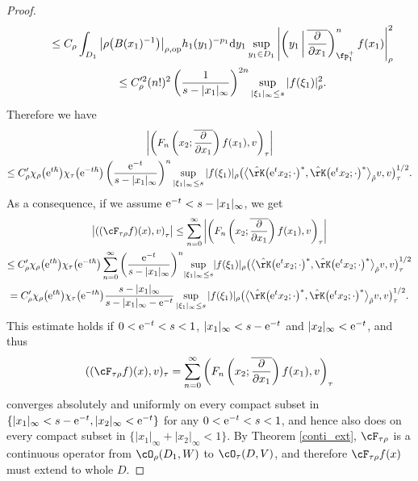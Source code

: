 \begin{proof}
\begin{gather}
\qquad{} \le C_\rho\int_{D_1} \big|\rho\big(B(x_1)^{-1}\big)\big|_{\rho,\mathrm{op}}h_1(y_1)^{-p_1}{\rm d}y_1
\sup_{y_1\in D_1}\left|\left(y_1\,\middle|\,\overline{\frac{\partial}{\partial x_1}}\right)_{\fp^+_1}^nf(x_1)\right|_\rho^2 \notag \\
\qquad{} \le C_\rho^{\prime 2}(n!)^2\left(\frac{1}{s-|x_1|_\infty}\right)^{2n}\sup_{|\xi_1|_\infty\le s}|f(\xi_1)|_\rho^2. \label{higherdiff}
\end{gather}
Therefore we have
\begin{gather*}
 \left|\left(F_n\left(x_2;\overline{\frac{\partial}{\partial x_1}}\right)f(x_1),v\right)_\tau\right| \\
 \le C_\rho'\chi_\rho\big({\rm e}^{t\hbar}\big)\chi_\tau\big({\rm e}^{-t\hbar}\big)
\left(\frac{{\rm e}^{-t}}{s-|x_1|_\infty}\right)^n\sup_{|\xi_1|_\infty\le s}|f(\xi_1)|_\rho
\big(\big\langle\hat{\rK}\big({\rm e}^tx_2;\cdot\big)^*,
\hat{\rK}\big({\rm e}^tx_2;\cdot\big)^*\big\rangle_{\hat{\rho}}v,v\big)_\tau^{1/2}.
\end{gather*}
As a consequence, if we assume ${\rm e}^{-t}<s-|x_1|_\infty$, we get
\begin{gather*}
 \left|\left((\cF_{\tau\rho}f)(x),v\right)_\tau\right|\le\sum_{n=0}^\infty
\left|\left(F_n\left(x_2;\overline{\frac{\partial}{\partial x_1}}\right)f(x_1),v\right)_\tau\right| \\
 \le C_\rho'\chi_\rho\big({\rm e}^{t\hbar}\big)\chi_\tau\big({\rm e}^{-t\hbar}\big)
\sum_{n=0}^\infty \left(\frac{{\rm e}^{-t}}{s-|x_1|_\infty}\right)^n\!\sup_{|\xi_1|_\infty\le s}\!|f(\xi_1)|_\rho
\big(\big\langle\hat{\rK}\big({\rm e}^tx_2;\cdot\big)^* ,
\hat{\rK}\big({\rm e}^tx_2;\cdot\big)^*\big\rangle_{\hat{\rho}}v,v\big)_\tau^{1/2} \\
 =C_\rho'\chi_\rho\big({\rm e}^{t\hbar}\big)\chi_\tau\big({\rm e}^{-t\hbar}\big)\frac{s-|x_1|_\infty}{s-|x_1|_\infty-{\rm e}^{-t}}\sup_{|\xi_1|_\infty\le s}|f(\xi_1)|_\rho
\big(\big\langle\hat{\rK}\big({\rm e}^tx_2;\cdot\big)^*,
\hat{\rK}\big({\rm e}^tx_2;\cdot\big)^*\big\rangle_{\hat{\rho}}v,v\big)_\tau^{1/2}.
\end{gather*}
This estimate holds if $0<{\rm e}^{-t}<s<1$, $|x_1|_\infty<s-{\rm e}^{-t}$ and $|x_2|_\infty<{\rm e}^{-t}$, and thus
\begin{gather*}
 ((\cF_{\tau\rho}f)(x),v )_\tau=\sum_{n=0}^\infty\left(F_n\left(x_2;\overline{\frac{\partial}{\partial x_1}}\right)f(x_1),v\right)_\tau
\end{gather*}
converges absolutely and uniformly on every compact subset in $\{|x_1|_\infty<s-{\rm e}^{-t},|x_2|_\infty<{\rm e}^{-t}\}$ for any $0<{\rm e}^{-t}<s<1$,
and hence also does on every compact subset in $\{|x_1|_\infty+|x_2|_\infty<1\}$.
By Theorem \ref{conti_ext}, $\cF_{\tau\rho}$ is a continuous operator from $\cO_\rho(D_1,W)$ to $\cO_\tau(D,V)$,
and therefore $\cF_{\tau\rho} f(x)$ must extend to whole $D$.
\end{proof}

